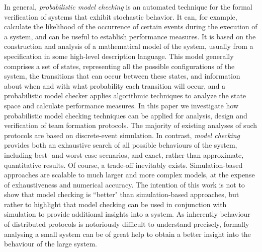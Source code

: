 \documentclass{llncs}
\begin{document}
In general, \emph{probabilistic model checking} is an automated technique for
the formal verification of systems that exhibit stochastic behavior. It can, for example,
calculate the likelihood of the occurrence of certain events
during the execution of a system, and can be useful to establish performance
measures. It is based on the construction and analysis of a
mathematical model of the system, usually from a specification
in some high-level description language. This model
generally comprises a set of states, representing all the possible
configurations of the system, the transitions that can
occur between these states, and information about when and
with what probability each transition will occur, and a probabilistic model checker applies algorithmic techniques to analyze the state space and calculate performance measures.
In this paper we investigate  how probabilistic model checking techniques can be applied for analysis, design and verification of team formation protocols. The majority of existing analyses of such protocols are based on discrete-event simulation. In contrast, \emph{model checking} provides both an exhaustive search of all possible behaviours of the system, including best- and worst-case scenarios, and exact, rather than approximate, quantitative results. Of course, a trade-off inevitably exists. Simulation-based approaches are scalable to much larger and more complex models, at the expense of exhaustiveness and numerical accuracy. The intention of this work is not to show that model checking is ``better" than simulation-based approaches, but rather to highlight that model checking can be used in conjunction with simulation to provide additional insights into a system. As inherently behaviour of distributed protocols is notoriously difficult to understand precisely, formally analysing a small system can be of great help to obtain a better insight into the behaviour of the large system.
\end{document}

